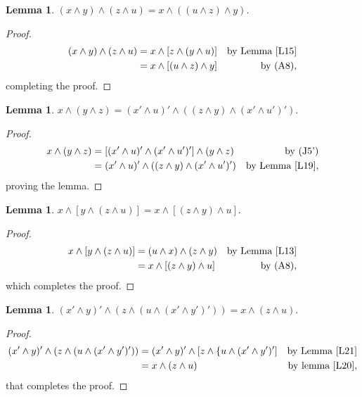 \documentclass{amsart}
\theoremstyle{plain}
\newtheorem{lemma}[theorem]{Lemma}
\theoremstyle{problem}
\theoremstyle{definition}
\theoremstyle{remark}
\numberwithin{equation}{section}
\begin{document}
\begin{lemma} \label{L19} 
 $(x \land y)\land (z \land u) = x \land ((u \land z) \land y).$ 
\end{lemma}

\begin{proof}
\begin{align*}
(x \land y)\land (z \land u) &= x \land [z \land (y \land u)]  &\text{by Lemma \ref{L15}}\\ 
                                          &= x \land [(u \land z) \land y]  &\text{by (A8)},
\end{align*}
completing the proof.
\end{proof}

\begin{lemma} \label{L20} 
 $x \land (y \land z) = (x' \land u)' \land ((z \land y) \land (x' \land u')').$ 
\end{lemma}

\begin{proof}
\begin{align*}
x \land (y \land z) &= [(x' \land u)' \land (x' \land u')'] \land (y \land z)  &\text{by (J5')}\\
                             &= (x' \land u)' \land ((z \land y) \land (x' \land u')')   &\text{by Lemma \ref{L19}}, 
\end{align*}
proving the lemma.
\end{proof}


\begin{lemma} \label{L21}  
 $x \land [y \land (z \land u)] = x \land [(z \land y) \land u].$  
\end{lemma}

\begin{proof}
\begin{align*}
x \land [y \land (z \land u)] &=  (u \land x) \land (z \land y) &\text{by Lemma \ref{L13}}\\ 
                                           &= x \land [(z \land y) \land u] &\text{by (A8)},                        \\
\end{align*}
which completes the proof.
\end{proof}


\begin{lemma} \label{L22} 
 $(x' \land y)' \land (z \land (u \land (x' \land y')')) = x \land (z \land u).$  
\end{lemma}

\begin{proof}
\begin{align*}
(x' \land y)' \land (z \land (u \land (x' \land y')')) &= (x' \land y)' \land [z \land \{u \land (x' \land y')']  &\text{by Lemma \ref{L21}}\\ 
                                                                          &= x \land (z \land u) &\text{by lemma \ref{L20}},  
\end{align*}
that completes the proof.
\end{proof}
\end{document}
